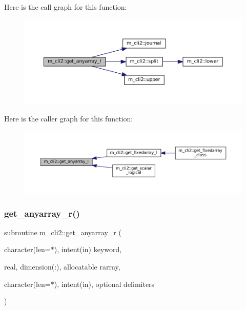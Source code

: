Here is the call graph for this function\+:\nopagebreak
\begin{figure}[H]
\begin{center}
\leavevmode
\includegraphics[width=350pt]{namespacem__cli2_a47cc758d20b655bc21672c31289e54ce_cgraph}
\end{center}
\end{figure}
Here is the caller graph for this function\+:\nopagebreak
\begin{figure}[H]
\begin{center}
\leavevmode
\includegraphics[width=350pt]{namespacem__cli2_a47cc758d20b655bc21672c31289e54ce_icgraph}
\end{center}
\end{figure}
\mbox{\label{namespacem__cli2_a8f1d5223b075f23d513c94548a1ebf09}} 
\subsubsection{\texorpdfstring{get\+\_\+anyarray\+\_\+r()}{get\_anyarray\_r()}}
{\footnotesize\ttfamily subroutine m\+\_\+cli2\+::get\+\_\+anyarray\+\_\+r (\begin{DoxyParamCaption}\item[{character(len=$\ast$), intent(in)}]{keyword,  }\item[{real, dimension(\+:), allocatable}]{rarray,  }\item[{character(len=$\ast$), intent(in), optional}]{delimiters }\end{DoxyParamCaption})\hspace{0.3cm}{\ttfamily [private]}}



